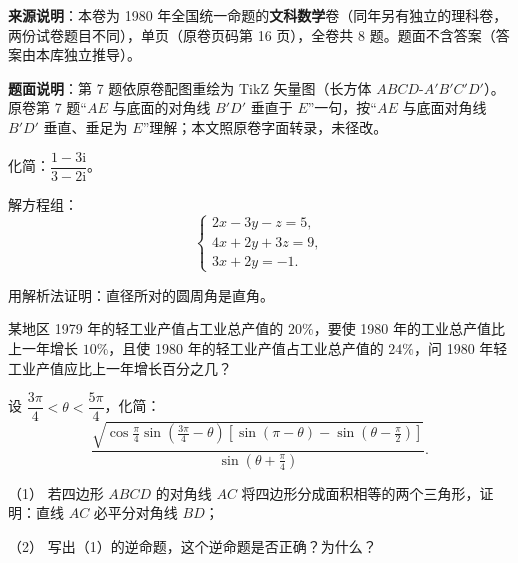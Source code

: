 

\begin{gktip}
\textbf{来源说明}：本卷为 1980 年全国统一命题的\textbf{文科数学}卷（同年另有独立的理科卷，两份试卷题目不同），单页（原卷页码第 16 页），全卷共 8 题。题面不含答案（答案由本库独立推导）。

\textbf{题面说明}：第 7 题依原卷配图重绘为 TikZ 矢量图（长方体 $ABCD\text{-}A'B'C'D'$）。原卷第 7 题“$AE$ 与底面的对角线 $B'D'$ 垂直于 $E$”一句，按“$AE$ 与底面对角线 $B'D'$ 垂直、垂足为 $E$”理解；本文照原卷字面转录，未径改。
\end{gktip}

\begin{question}
化简：$\dfrac{1-3\mathrm i}{3-2\mathrm i}$。

\end{question}
\begin{question}
解方程组：
\nopagebreak[4]
\[
\begin{cases}
2x-3y-z=5,\\
4x+2y+3z=9,\\
3x+2y=-1.
\end{cases}
\]

\end{question}
\begin{question}
用解析法证明：直径所对的圆周角是直角。

\end{question}
\begin{question}
某地区 1979 年的轻工业产值占工业总产值的 $20\%$，要使 1980 年的工业总产值比上一年增长 $10\%$，且使 1980 年的轻工业产值占工业总产值的 $24\%$，问 1980 年轻工业产值应比上一年增长百分之几？

\end{question}
\begin{question}
设 $\dfrac{3\pi}{4}<\theta<\dfrac{5\pi}{4}$，化简：
\nopagebreak[4]
\[
\frac{\sqrt{\cos\frac{\pi}{4}\sin\left(\frac{3\pi}{4}-\theta\right)\left[\sin(\pi-\theta)-\sin\left(\theta-\frac{\pi}{2}\right)\right]}}{\sin\left(\theta+\frac{\pi}{4}\right)}.
\]

\end{question}
\begin{question}

（1） 若四边形 $ABCD$ 的对角线 $AC$ 将四边形分成面积相等的两个三角形，证明：直线 $AC$ 必平分对角线 $BD$；

（2） 写出（1）的逆命题，这个逆命题是否正确？为什么？

\Needspace{0.4\textheight}
\end{question}
